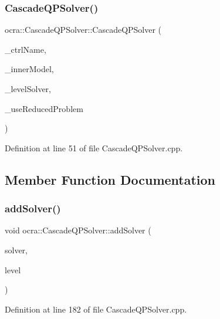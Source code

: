 \subsubsection{\texorpdfstring{Cascade\+Q\+P\+Solver()}{CascadeQPSolver()}}
{\footnotesize\ttfamily ocra\+::\+Cascade\+Q\+P\+Solver\+::\+Cascade\+Q\+P\+Solver (\begin{DoxyParamCaption}\item[{const std\+::string \&}]{\+\_\+ctrl\+Name,  }\item[{Model\+::\+Ptr}]{\+\_\+inner\+Model,  }\item[{One\+Level\+Solver\+::\+Ptr}]{\+\_\+level\+Solver,  }\item[{bool}]{\+\_\+use\+Reduced\+Problem }\end{DoxyParamCaption})}



Definition at line 51 of file Cascade\+Q\+P\+Solver.\+cpp.



\subsection{Member Function Documentation}
\hypertarget{classocra_1_1CascadeQPSolver_af0c103a167f7c63adcfb28af29bae544}{}\label{classocra_1_1CascadeQPSolver_af0c103a167f7c63adcfb28af29bae544} 
\subsubsection{\texorpdfstring{add\+Solver()}{addSolver()}}
{\footnotesize\ttfamily void ocra\+::\+Cascade\+Q\+P\+Solver\+::add\+Solver (\begin{DoxyParamCaption}\item[{One\+Level\+Solver\+::\+Ptr}]{solver,  }\item[{int}]{level }\end{DoxyParamCaption})}



Definition at line 182 of file Cascade\+Q\+P\+Solver.\+cpp.

\hypertarget{classocra_1_1CascadeQPSolver_a42c413b6eeef99c2bdee577991f1e9a4}{}\label{classocra_1_1CascadeQPSolver_a42c413b6eeef99c2bdee577991f1e9a4} 

